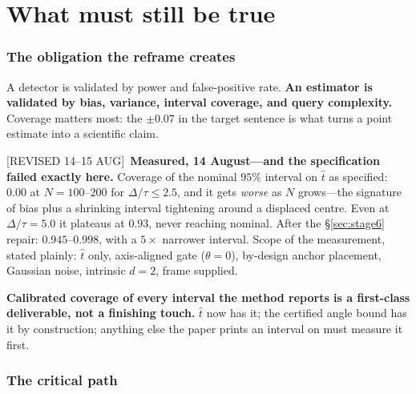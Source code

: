 \documentclass[11pt]{article}
\newcommand{\that}{\hat{t}}
\newcommand{\provtag}[2]{{\footnotesize\sffamily\textcolor{#1}{[#2]}}}
\newcommand{\REVI}{\provtag{openamber}{REVISED 14--15 AUG}}
\begin{document}
\part{What must still be true}

\section{The obligation the reframe creates}
\label{sec:obligation}

A detector is validated by power and false-positive rate. \textbf{An estimator is validated by
bias, variance, interval coverage, and query complexity.} Coverage matters most: the $\pm 0.07$
in the target sentence is what turns a point estimate into a scientific claim.

\REVI\ \textbf{Measured, 14 August---and the specification failed exactly here.} Coverage of
the nominal $95\%$ interval on $\that$ as specified: $\mathbf{0.00}$ at $N = 100$--$200$ for
$\Delta/\tau \le 2.5$, and it gets \emph{worse} as $N$ grows---the signature of bias plus a
shrinking interval tightening around a displaced centre. Even at $\Delta/\tau = 5.0$ it
plateaus at $0.93$, never reaching nominal. After the \S\ref{sec:stage6} repair:
$\mathbf{0.945}$--$\mathbf{0.998}$, with a $5\times$ narrower interval. Scope of the
measurement, stated plainly: $\that$ only, axis-aligned gate ($\theta = 0$), by-design anchor
placement, Gaussian noise, intrinsic $d = 2$, frame supplied.

\begin{claimbox}
\noindent \textbf{Calibrated coverage of every interval the method reports is a first-class
deliverable, not a finishing touch.} $\that$ now has it; the certified angle bound has it by
construction; anything else the paper prints an interval on must measure it first.
\end{claimbox}

\section{The critical path}
\label{sec:path}
\end{document}
